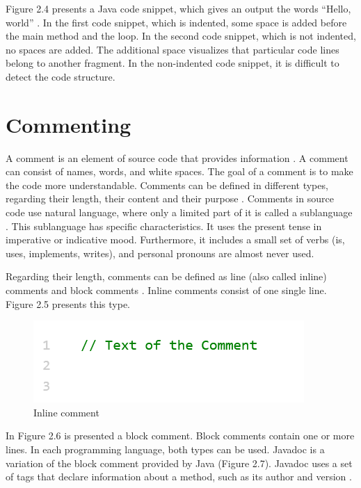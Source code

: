 Figure 2.4 presents a Java code snippet, which gives an output the words “Hello, world”  \cite{hanenberg2024indentation}.
In the first code snippet, which is indented, some space is added before the main method and the loop.  In the second code snippet, which is not indented, no spaces are added. The additional space visualizes that particular code lines belong to another fragment. In the non-indented code snippet, it is difficult to detect the code structure. 
 





\section{Commenting}
A comment is an element of source code that provides information \cite{de2011comment}. A comment can consist of names, words, and white spaces.  The goal of a comment is to make the code more understandable.  Comments can be defined in different types, regarding their length, their content and their purpose \cite{de2011comment} \cite{de2017investigating}. Comments in source code use natural language, where only a limited part of it is called a sublanguage \cite{de2017investigating}. This sublanguage has specific characteristics. It uses the present tense in imperative or indicative mood. Furthermore, it includes a small set of verbs (is, uses, implements, writes), and personal pronouns are almost never used.

Regarding their length, comments can be defined as line (also called inline) comments and block comments \cite{de2017investigating}. Inline comments consist of one single line. Figure 2.5 presents this type. 

\begin{figure} [H]
  \centering
  \includegraphics [scale=1]
  {figures/inline.png}
  \caption{Inline comment 
  \cite{de2011comment}}
  \label{fig:AnhangsChor}
\end{figure}

In Figure 2.6 is presented a block comment.  Block comments contain one or more lines. In each programming language, both types can be used. Javadoc is a variation of the block comment provided by Java (Figure 2.7).  Javadoc uses a set of tags that declare information about a method, such as its author and version \cite{de2011comment}.

